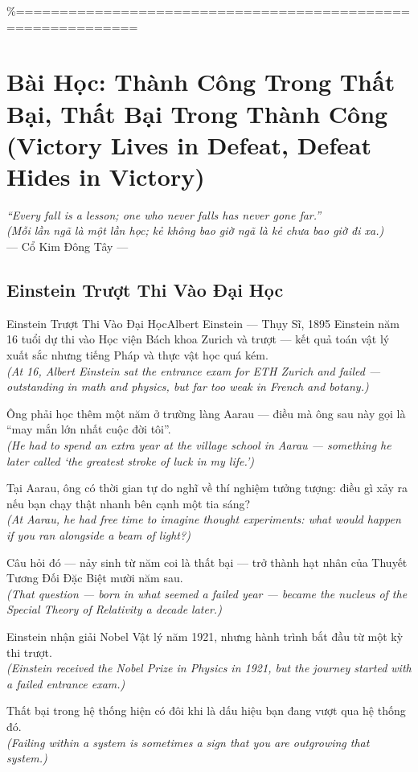 \%============================================================
\chapter{Bài Học: Thành Công Trong Thất Bại, Thất Bại Trong Thành Công (Victory Lives in Defeat, Defeat Hides in Victory)}
\begin{center}
  \textit{\color{truyengold}``Every fall is a lesson; one who never falls has never gone far.''}\\[4pt]
  \textit{(Mỗi lần ngã là một lần học; kẻ không bao giờ ngã là kẻ chưa bao giờ đi xa.)}\\[4pt]
  \small\color{truyenblue}--- Cổ Kim Đông Tây ---
\end{center}
\ngancach

\section{Einstein Trượt Thi Vào Đại Học}
\begin{truyen}{Einstein Trượt Thi Vào Đại Học}{Albert Einstein --- Thụy Sĩ, 1895}
 Einstein năm 16 tuổi dự thi vào Học viện Bách khoa Zurich và trượt --- kết quả toán vật lý xuất sắc nhưng tiếng Pháp và thực vật học quá kém.\\[4pt]
\textit{(At 16, Albert Einstein sat the entrance exam for ETH Zurich and failed --- outstanding in math and physics, but far too weak in French and botany.)}

Ông phải học thêm một năm ở trường làng Aarau --- điều mà ông sau này gọi là ``may mắn lớn nhất cuộc đời tôi''.\\[4pt]
\textit{(He had to spend an extra year at the village school in Aarau --- something he later called `the greatest stroke of luck in my life.')}

Tại Aarau, ông có thời gian tự do nghĩ về thí nghiệm tưởng tượng: điều gì xảy ra nếu bạn chạy thật nhanh bên cạnh một tia sáng?\\[4pt]
\textit{(At Aarau, he had free time to imagine thought experiments: what would happen if you ran alongside a beam of light?)}

Câu hỏi đó --- nảy sinh từ năm coi là thất bại --- trở thành hạt nhân của Thuyết Tương Đối Đặc Biệt mười năm sau.\\[4pt]
\textit{(That question --- born in what seemed a failed year --- became the nucleus of the Special Theory of Relativity a decade later.)}

Einstein nhận giải Nobel Vật lý năm 1921, nhưng hành trình bắt đầu từ một kỳ thi trượt.\\[4pt]
\textit{(Einstein received the Nobel Prize in Physics in 1921, but the journey started with a failed entrance exam.)}

\end{truyen}
\begin{baihoc}
  Thất bại trong hệ thống hiện có đôi khi là dấu hiệu bạn đang vượt qua hệ thống đó.\\[4pt]
  \textit{(Failing within a system is sometimes a sign that you are outgrowing that system.)}
\end{baihoc}

